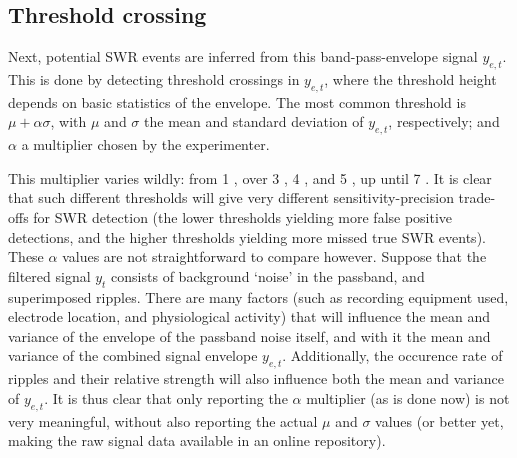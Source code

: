 \subsection{Threshold crossing}

Next, potential SWR events are inferred from this band-pass-envelope signal $y_{e,t}$. This is done by detecting threshold crossings in $y_{e,t}$, where the threshold height depends on basic statistics of the envelope. The most common threshold is $\mu + \alpha \sigma$, with $\mu$ and $\sigma$ the mean and standard deviation of $y_{e,t}$, respectively; and $\alpha$ a multiplier chosen by the experimenter.

This multiplier varies wildly: from 1 \cite{Csicsvari2000}, over 3 \cite{Dutta2018}, 4 \cite{Behrens2005}, and 5 \cite{Sadowski2016}, up until 7 \cite{Nadasdy1999}. It is clear that such different thresholds will give very different sensitivity-precision trade-offs for SWR detection (the lower thresholds yielding more false positive detections, and the higher thresholds yielding more missed true SWR events). These $\alpha$ values are not straightforward to compare however. Suppose that the filtered signal $y_t$ consists of background `noise' in the passband, and superimposed ripples. There are many factors (such as recording equipment used, electrode location, and physiological activity) that will influence the mean and variance of the envelope of the passband noise itself, and with it the mean and variance of the combined signal envelope $y_{e,t}$. Additionally, the occurence rate of ripples and their relative strength will also influence both the mean and variance of $y_{e,t}$. It is thus clear that only reporting the $\alpha$ multiplier (as is done now) is not very meaningful, without also reporting the actual $\mu$ and $\sigma$ values (or better yet, making the raw signal data available in an online repository).


